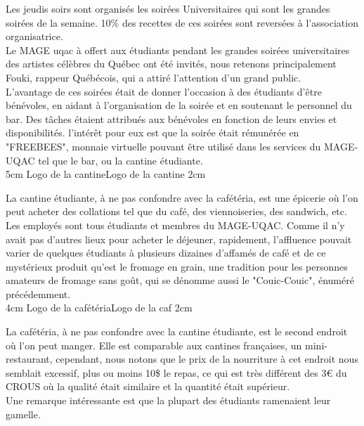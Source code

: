 Les jeudis soirs sont organisés les soirées Universitaires qui sont les grandes soirées de la semaine.
10\% des recettes de ces soirées sont reversées à l’association organisatrice.\\
Le MAGE uqac à offert aux étudiants pendant les grandes soirées universitaires des artistes célèbres du Québec ont été invités, nous retenons principalement Fouki, rappeur Québécois, qui a attiré l'attention d'un grand public.\\

L'avantage de ces soirées était de donner l'occasion à des étudiants d'être bénévoles, en aidant à l'organisation de la soirée et en soutenant le personnel du bar. Des tâches étaient attribués aux bénévoles en fonction de leurs envies et disponibilités. l'intérêt pour eux est que la soirée était rémunérée en "FREEBEES", monnaie virtuelle pouvant être utilisé dans les services du MAGE-UQAC tel que le bar, ou la cantine étudiante.\\

{5cm}
{Logo de la cantine}{Logo de la cantine}
{2cm}

La cantine étudiante, à ne pas confondre avec la cafétéria, est une épicerie où l'on peut acheter des collations tel que du café, des viennoiseries, des sandwich, etc. Les employés sont tous étudiants et membres du MAGE-UQAC. Comme il n'y avait pas d'autres lieux pour acheter le déjeuner, rapidement, l'affluence pouvait varier de quelques étudiants à plusieurs dizaines d'affamés de café et de ce mystérieux produit qu'est le fromage en grain, une tradition pour les personnes amateurs de fromage sans goût, qui se dénomme aussi le "Couic-Couic", énuméré précédemment.\\

{4cm}
{Logo de la cafétéria}{Logo de la caf}
{2cm}

La cafétéria, à ne pas confondre avec la cantine étudiante, est le second endroit où l'on peut manger. Elle est comparable aux cantines françaises, un mini-restaurant, cependant, nous notons que le prix de la nourriture à cet endroit nous semblait excessif, plus ou moins 10\$ le repas, ce qui est très différent des 3\euro{} du CROUS où la qualité était similaire et la quantité était supérieur.\\

Une remarque intéressante est que la plupart des étudiants ramenaient leur gamelle.\\

